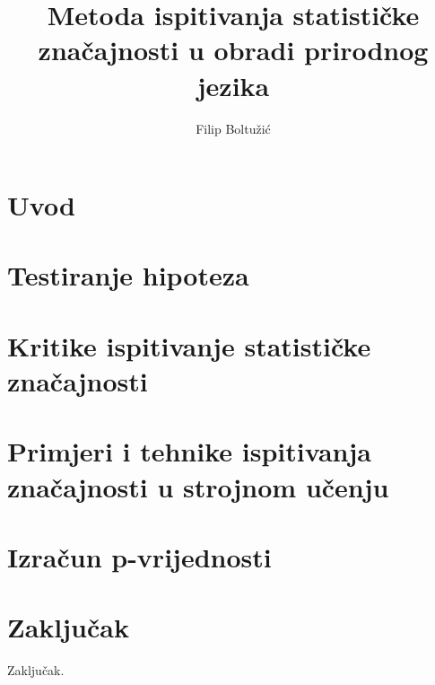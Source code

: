 \documentclass[times, utf8, seminar]{fer}
\begin{document}

\title{Metoda ispitivanja statističke značajnosti u obradi prirodnog jezika}

\author{Filip Boltužić}
\maketitle

\tableofcontents

\chapter{Uvod}


\chapter{Testiranje hipoteza}


\chapter{Kritike ispitivanje statističke značajnosti}


\chapter{Primjeri i tehnike ispitivanja značajnosti u strojnom učenju}


\chapter{Izračun p-vrijednosti}

\chapter{Zaključak}
Zaključak.



\end{document}
